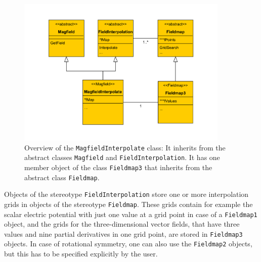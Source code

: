       \begin{figure}[h]
		\centering \includegraphics[width=0.9\textwidth]{images/KNAXSFigures/mag_interpolation_uml.pdf}
		\caption{Overview of the \texttt{MagfieldInterpolate} class: It inherits from the abstract classes \texttt{Magfield} and \texttt{FieldInterpolation}. It has one member object of the class \texttt{Fieldmap3} that inherits from the abstract class \texttt{Fieldmap}.}
		\label{fig:Magfieldinterpolate overview}
      \end{figure}
      Objects of the stereotype \texttt{FieldInterpolation} store one or more interpolation grids in objects of the stereotype \texttt{Fieldmap}. These grids contain for example the scalar electric potential with just one value at a grid point in case of a \texttt{Fieldmap1} object, and the grids for the three-dimensional vector fields, that have three values and nine partial derivatives in one grid point, are stored in  \texttt{Fieldmap3} objects. In case of rotational symmetry, one can also use the \texttt{Fieldmap2} objects, but this has to be specified explicitly by the user.
